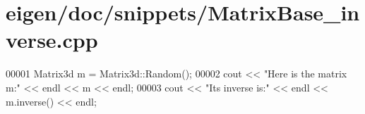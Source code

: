 \hypertarget{eigen_2doc_2snippets_2_matrix_base__inverse_8cpp_source}{}\section{eigen/doc/snippets/\+Matrix\+Base\+\_\+inverse.cpp}
\label{eigen_2doc_2snippets_2_matrix_base__inverse_8cpp_source}

\begin{DoxyCode}
00001 Matrix3d m = Matrix3d::Random();
00002 cout << \textcolor{stringliteral}{"Here is the matrix m:"} << endl << m << endl;
00003 cout << \textcolor{stringliteral}{"Its inverse is:"} << endl << m.inverse() << endl;
\end{DoxyCode}
